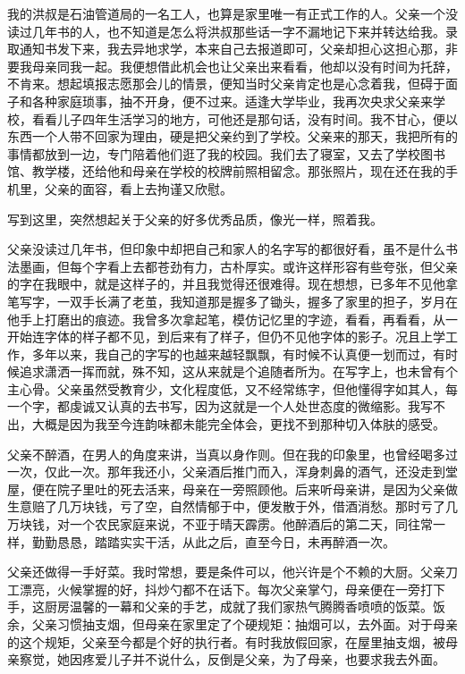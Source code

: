 \documentclass[UTF8,a4paper,8pt]{ctexart}
\begin{document}
 我的洪叔是石油管道局的一名工人，也算是家里唯一有正式工作的人。父亲一个没读过几年书的人，也不知道是怎么将洪叔那些话一字不漏地记下来并转达给我。录取通知书发下来，我去异地求学，本来自己去报道即可，父亲却担心这担心那，非要我母亲同我一起。我便想借此机会也让父亲出来看看，他却以没有时间为托辞，不肯来。想起填报志愿那会儿的情景，便知当时父亲肯定也是心念着我，但碍于面子和各种家庭琐事，抽不开身，便不过来。适逢大学毕业，我再次央求父亲来学校，看看儿子四年生活学习的地方，可他还是那句话，没有时间。我不甘心，便以东西一个人带不回家为理由，硬是把父亲约到了学校。父亲来的那天，我把所有的事情都放到一边，专门陪着他们逛了我的校园。我们去了寝室，又去了学校图书馆、教学楼，还给他和母亲在学校的校牌前照相留念。那张照片，现在还在我的手机里，父亲的面容，看上去拘谨又欣慰。
 
 写到这里，突然想起关于父亲的好多优秀品质，像光一样，照着我。
 
 父亲没读过几年书，但印象中却把自己和家人的名字写的都很好看，虽不是什么书法墨画，但每个字看上去都苍劲有力，古朴厚实。或许这样形容有些夸张，但父亲的字在我眼中，就是这样子的，并且我觉得还很难得。现在想想，已多年不见他拿笔写字，一双手长满了老茧，我知道那是握多了锄头，握多了家里的担子，岁月在他手上打磨出的痕迹。我曾多次拿起笔，模仿记忆里的字迹，看看，再看看，从一开始连字体的样子都不见，到后来有了样子，但仍不见他字体的影子。况且上学工作，多年以来，我自己的字写的也越来越轻飘飘，有时候不认真便一划而过，有时候追求潇洒一挥而就，殊不知，这从来就是个追随者所为。在写字上，也未曾有个主心骨。父亲虽然受教育少，文化程度低，又不经常练字，但他懂得字如其人，每一个字，都虔诚又认真的去书写，因为这就是一个人处世态度的微缩影。我写不出，大概是因为我至今连韵味都未能完全体会，更找不到那种切入体肤的感受。
 
 父亲不醉酒，在男人的角度来讲，当真以身作则。但在我的印象里，也曾经喝多过一次，仅此一次。那年我还小，父亲酒后推门而入，浑身刺鼻的酒气，还没走到堂屋，便在院子里吐的死去活来，母亲在一旁照顾他。后来听母亲讲，是因为父亲做生意赔了几万块钱，亏了空，自然情郁于中，便发散于外，借酒消愁。那时亏了几万块钱，对一个农民家庭来说，不亚于晴天霹雳。他醉酒后的第二天，同往常一样，勤勤恳恳，踏踏实实干活，从此之后，直至今日，未再醉酒一次。
 
 父亲还做得一手好菜。我时常想，要是条件可以，他兴许是个不赖的大厨。父亲刀工漂亮，火候掌握的好，抖炒勺都不在话下。每次父亲掌勺，母亲便在一旁打下手，这厨房温馨的一幕和父亲的手艺，成就了我们家热气腾腾香喷喷的饭菜。饭余，父亲习惯抽支烟，但母亲在家里定了个硬规矩：抽烟可以，去外面。对于母亲的这个规矩，父亲至今都是个好的执行者。有时我放假回家，在屋里抽支烟，被母亲察觉，她因疼爱儿子并不说什么，反倒是父亲，为了母亲，也要求我去外面。
 
\end{document}
